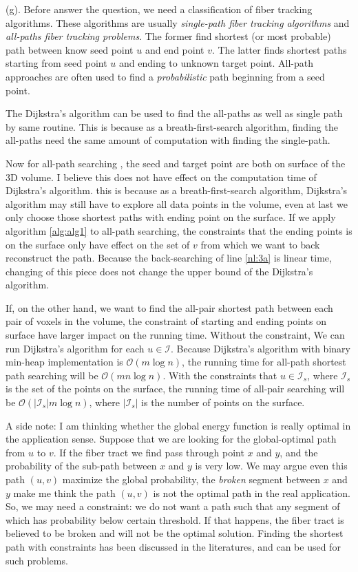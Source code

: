 \documentclass[12pt]{article}
\begin{document}
(g). Before answer the question, we need a classification of fiber tracking
algorithms. These algorithms are usually \emph{single-path fiber tracking
  algorithms} and \emph{all-paths fiber tracking problems}. The former find
shortest (or most probable) path between know seed point $u$ and end point
$v$. The latter finds shortest paths starting from seed point $u$ and ending to
unknown target point. All-path approaches are often used to find a \emph{probabilistic} path beginning from a seed point. 

The Dijkstra's algorithm can be used to find the all-paths as well as single
path by same routine. This is because as a breath-first-search algorithm,
finding the all-paths need the same amount of computation with finding the
single-path. 

Now for all-path searching , the seed and target point are both on surface of
the 3D volume. I believe this does not have effect on the computation time of
Dijkstra's algorithm. this is because as a breath-first-search algorithm,
Dijkstra's algorithm may still have to explore all data points in the volume,
even at last we only choose those shortest paths with ending point on the
surface. If we apply algorithm \ref{alg:alg1} to all-path searching, the
constraints that the ending points is on the surface only have effect on the set
of $v$ from which we want to back reconstruct the path.  Because the
back-searching of line \ref{nl:3a} is linear time, changing of this piece does
not change the upper bound of the Dijkstra's algorithm.

If, on the other hand, we want to find the all-pair shortest path between each
pair of voxels in the volume, the constraint of starting and ending points on
surface have larger impact on the running time. Without the constraint, We can
run Dijkstra's algorithm for each $u\in\mathcal{I}$. Because Dijkstra's
algorithm with binary min-heap implementation is $\mathcal{O}(m\log n)$, the
running time for all-path shortest path searching will be $\mathcal{O}(mn\log
n)$. With the constraints that $u\in \mathcal{I}_s$, where $\mathcal{I}_s$ is
the set of the points on the surface, the running time of all-pair searching
will be $\mathcal{O}(|\mathcal{I}_s| m\log n)$, where $|\mathcal{I}_s|$ is the
number of points on the surface.

A side note: I am thinking whether the global energy function is really optimal
in the application sense. Suppose that we are looking for the global-optimal
path from $u$ to $v$. If the fiber tract we find pass through point $x$ and $y$,
and the probability of the sub-path between $x$ and $y$ is very low. We may
argue even this path $(u,v)$ maximize the global probability, the \emph{broken}
segment between $x$ and $y$ make me think the path $(u,v)$ is not the optimal
path in the real application. So, we may need a constraint: we do not want a
path such that any segment of which has probability below certain threshold. If
that happens, the fiber tract is believed to be broken and will not be the
optimal solution. Finding the shortest path with constraints has been discussed
in the literatures, and can be used for such problems.
\end{document}
